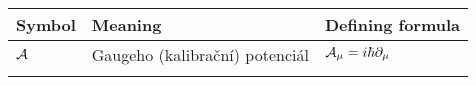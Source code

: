

\begin{tabular} {@{}C{1.9cm}@{}p{8cm}@{}C{3.77cm}}
	\toprule
	\textbf{Symbol}& \textbf{Meaning}& \textbf{Defining formula}\\\bottomrule
	$\mathcal{A}$ & Gaugeho (kalibrační) potenciál & $\mathcal{A}_\mu=i\hbar \partial_\mu$ \\

\bottomrule
{}
\end{tabular}

